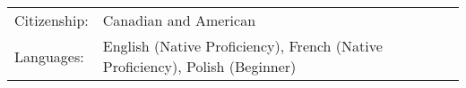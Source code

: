 \begin{tabularx}{\linewidth}{@{}l X@{}}
Citizenship: &  \normalsize{Canadian and American}\\
Languages:  &  \normalsize{English (Native Proficiency), French (Native Proficiency), Polish (Beginner)}\\  
\end{tabularx}